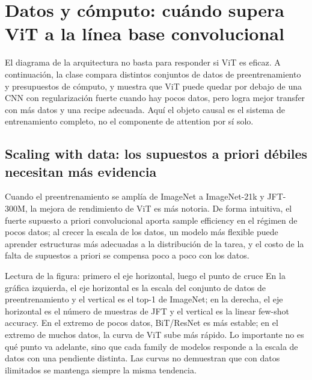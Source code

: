 \section{Datos y cómputo: cuándo supera ViT a la línea base convolucional}

El diagrama de la arquitectura no basta para responder si ViT es eficaz. A continuación, la clase compara distintos conjuntos de datos de preentrenamiento y presupuestos de cómputo, y muestra que ViT puede quedar por debajo de una CNN con regularización fuerte cuando hay pocos datos, pero logra mejor transfer con más datos y una recipe adecuada. Aquí el objeto causal es el sistema de entrenamiento completo, no el componente de attention por sí solo.

\subsection{Scaling with data: los supuestos a priori débiles necesitan más evidencia}

Cuando el preentrenamiento se amplía de ImageNet a ImageNet-21k y JFT-300M, la mejora de rendimiento de ViT es más notoria. De forma intuitiva, el fuerte supuesto a priori convolucional aporta sample efficiency en el régimen de pocos datos; al crecer la escala de los datos, un modelo más flexible puede aprender estructuras más adecuadas a la distribución de la tarea, y el costo de la falta de supuestos a priori se compensa poco a poco con los datos.


\begin{knowledgebox}{Lectura de la figura: primero el eje horizontal, luego el punto de cruce}
En la gráfica izquierda, el eje horizontal es la escala del conjunto de datos de preentrenamiento y el vertical es el top-1 de ImageNet; en la derecha, el eje horizontal es el número de muestras de JFT y el vertical es la linear few-shot accuracy. En el extremo de pocos datos, BiT/ResNet es más estable; en el extremo de muchos datos, la curva de ViT sube más rápido. Lo importante no es qué punto va adelante, sino que cada family de modelos responde a la escala de datos con una pendiente distinta. Las curvas no demuestran que con datos ilimitados se mantenga siempre la misma tendencia.
\end{knowledgebox}

